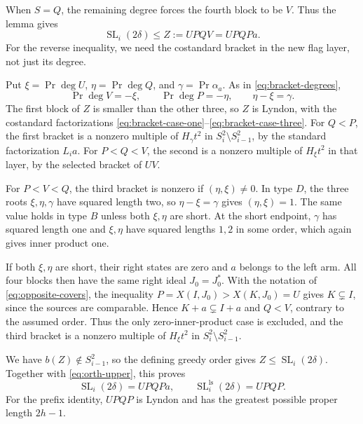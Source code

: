 \documentclass[11pt]{amsart}
\numberwithin{equation}{section}
\theoremstyle{definition}
\DeclareMathOperator{\SL}{SL}
\DeclareMathOperator{\Prj}{Pr}
\newcommand{\ls}{\mathrm{ls}}
\newcommand{\br}[1]{b(#1)}
\begin{document}
When $S=Q$, the remaining degree forces the fourth block to be $V$. Thus the lemma gives
\begin{equation}\label{eq:orth-upper}
 \SL_i(2\delta)\leq Z:=UPQV=UPQPa.
\end{equation}
For the reverse inequality, we need the costandard bracket in the new flag layer, not just its degree.

Put $\xi=\Prj\deg U$, $\eta=\Prj\deg Q$, and $\gamma=\Prj\alpha_a$. As in \eqref{eq:bracket-degrees},
\[
 \Prj\deg V=-\xi,\qquad \Prj\deg P=-\eta,
 \qquad \eta-\xi=\gamma.
\]
The first block of $Z$ is smaller than the other three, so $Z$ is Lyndon, with the costandard factorizations \eqref{eq:bracket-case-one}--\eqref{eq:bracket-case-three}. For $Q<P$, the first bracket is a nonzero multiple of $H_\gamma t^2$ in $S_i^2\setminus S_{i-1}^2$, by the standard factorization $L_i a$. For $P<Q<V$, the second is a nonzero multiple of $H_\xi t^2$ in that layer, by the selected bracket of $UV$.

For $P<V<Q$, the third bracket is nonzero if $(\eta,\xi)\ne0$. In type $D$, the three roots $\xi,\eta,\gamma$ have squared length two, so $\eta-\xi=\gamma$ gives $(\eta,\xi)=1$. The same value holds in type $B$ unless both $\xi,\eta$ are short. At the short endpoint, $\gamma$ has squared length one and $\xi,\eta$ have squared lengths $1,2$ in some order, which again gives inner product one.

If both $\xi,\eta$ are short, their right states are zero and $a$ belongs to the left arm. All four blocks then have the same right ideal $J_0=J_0^*$. With the notation of \eqref{eq:opposite-covers}, the inequality $P=X(I,J_0)>X(K,J_0)=U$ gives $K\subsetneq I$, since the sources are comparable. Hence $K+a\subsetneq I+a$ and $Q<V$, contrary to the assumed order. Thus the only zero-inner-product case is excluded, and the third bracket is a nonzero multiple of $H_\xi t^2$ in $S_i^2\setminus S_{i-1}^2$.

We have $\br{Z}\notin S_{i-1}^2$, so the defining greedy order gives $Z\leq\SL_i(2\delta)$. Together with \eqref{eq:orth-upper}, this proves
\begin{equation}\label{eq:orth-degree-two}
 \SL_i(2\delta)=UPQPa,\qquad
 \SL_i^{\ls}(2\delta)=UPQP.
\end{equation}
For the prefix identity, $UPQP$ is Lyndon and has the greatest possible proper length $2h-1$.
\end{document}
